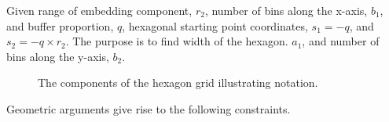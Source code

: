 \documentclass[
  12pt]{article}
\begin{document}
Given range of embedding component, \(r_2\), number of bins along the
x-axis, \(b_1\), and buffer proportion, \(q\), hexagonal starting point
coordinates, \(s_1 = -q\), and \(s_2 = -q \times r_2\). The purpose is
to find width of the hexagon. \(a_1\), and number of bins along the
y-axis, \(b_2\).

\begin{figure}[H]


\caption{\label{fig-hex-param}The components of the hexagon grid
illustrating notation.}

\end{figure}%

Geometric arguments give rise to the following constraints.
\end{document}
